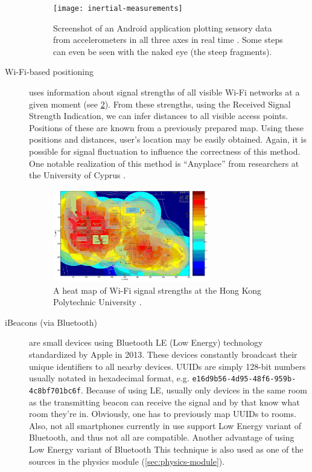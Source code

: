 \begin{description}
	\begin{figure}[h]
		\centering
		\texttt{[image: inertial-measurements]}
		\caption{Screenshot of an Android application plotting sensory data from accelerometers in all three axes in real time \cite{google-play:accelerometer}. Some steps can even be seen with the naked eye (the steep fragments).}
		\label{fig:inertial-measurements}
	\end{figure}
	
	\item[Wi-Fi-based positioning] uses information about signal strengths of all visible Wi-Fi networks at a given moment (see \cref{fig:wifi-positioning}). From these strengths, using the Received Signal Strength Indication, we can infer distances to all visible access points. Positions of these are known from a previously prepared map. Using these positions and distances, user's location may be easily obtained. Again, it is possible for signal fluctuation to influence the correctness of this method. One notable realization of this method is ``Anyplace'' from researchers at the University of Cyprus \cite{Anyplace}.
	
	\begin{figure}[h]
		\centering
		\includegraphics[width=0.67\textwidth]{wifi-positioning}
		\caption{A heat map of Wi-Fi signal strengths at the Hong Kong Polytechnic University \cite{hk:wifi-positioning}.}
		\label{fig:wifi-positioning}
	\end{figure}
	
	\item[iBeacons (via Bluetooth)] are small devices using Bluetooth LE (Low Energy) technology standardized by Apple in 2013. These devices constantly broadcast their unique identifiers to all nearby devices. UUIDs are simply 128-bit numbers usually notated in hexadecimal format, e.g. \texttt{e16d9b56-4d95-48f6-959b-4c8bf701bc6f}. Because of using LE, usually only devices in the same room as the transmitting beacon can receive the signal and by that know what room they're in. Obviously, one has to previously map UUIDs to rooms. Also, not all smartphones currently in use support Low Energy variant of Bluetooth, and thus not all are compatible. Another advantage of using Low Energy variant of Bluetooth  This technique is also used as one of the sources in the physics module (\cref{sec:physics-module}).
	

\end{description}
